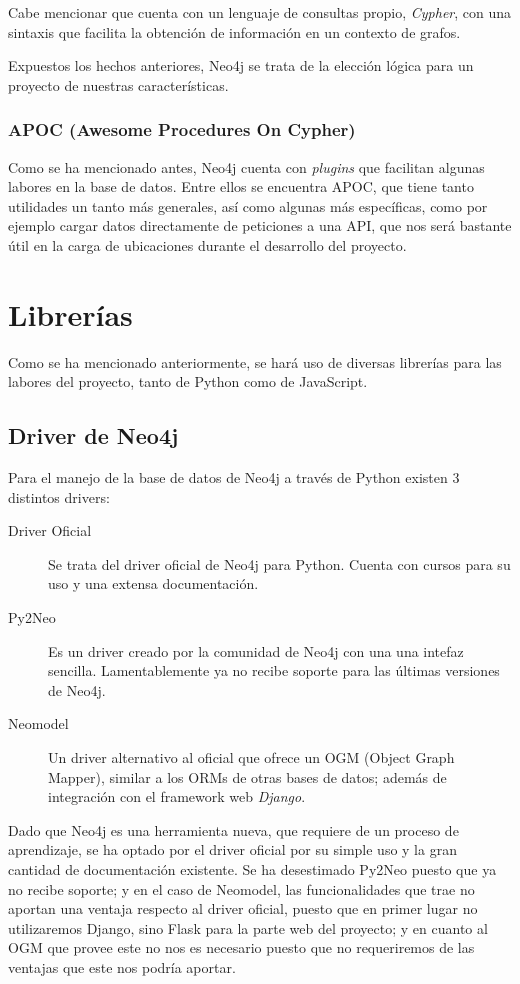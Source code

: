 Cabe mencionar 
que cuenta con un lenguaje de consultas propio, \textit{Cypher}, con una sintaxis que 
facilita la obtención de información en un contexto de grafos.

Expuestos los hechos anteriores, Neo4j se trata de la elección lógica para un proyecto de nuestras 
características.

\subsubsection{APOC (Awesome Procedures On Cypher)}
Como se ha mencionado antes, Neo4j cuenta con \textit{plugins} que facilitan algunas labores
en la base de datos. Entre ellos se encuentra APOC, que tiene tanto utilidades un tanto más generales,
así como algunas más específicas, como por ejemplo cargar datos directamente de peticiones a una API, que nos
será bastante útil en la carga de ubicaciones durante el desarrollo del proyecto.
\section{Librerías}
Como se ha mencionado anteriormente, se hará uso de diversas librerías para las labores del proyecto,
tanto de Python como de JavaScript.
\subsection{Driver de Neo4j}
Para el manejo de la base de datos de Neo4j a través de Python existen 3 distintos drivers:

\begin{description}
    \item [Driver Oficial] Se trata del driver oficial de Neo4j para Python. Cuenta con cursos para su uso y una extensa documentación.
    \item [Py2Neo] Es un driver creado por la comunidad de Neo4j con una una intefaz sencilla. Lamentablemente ya no recibe soporte para las últimas versiones de Neo4j.
    \item [Neomodel] Un driver alternativo al oficial que ofrece un OGM (Object Graph Mapper), similar a los ORMs de otras bases de datos; además de integración con el framework web \textit{Django}.
\end{description}

Dado que Neo4j es una herramienta nueva, que requiere de un proceso de aprendizaje, se ha optado
por el driver oficial por su simple uso y la gran cantidad de documentación existente. Se ha desestimado Py2Neo
puesto que ya no recibe soporte; y en el caso de Neomodel, las funcionalidades que trae no aportan una ventaja
respecto al driver oficial, puesto que en primer lugar no utilizaremos Django, sino Flask para la parte web del proyecto;
y en cuanto al OGM que provee este no nos es necesario puesto que no requeriremos de las ventajas que este nos podría aportar.

